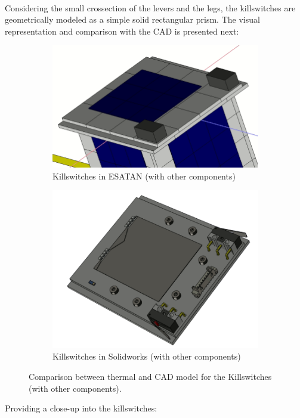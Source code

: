 \paragraph{}

Considering the small crossection of the levers and the legs, the killswitches are geometrically
modeled as a simple solid rectangular prism. The visual representation and comparison with the CAD
is presented next: 

\begin{figure}[H]
    \centering
    \begin{subfigure}{.5\textwidth}
      \centering
      \includegraphics[width=.6\linewidth]{res/img/5_simulationanalisys/Comparisons/ESATAN/Killswitches.PNG}
      \caption{Killswitches in ESATAN (with other components)}
      \label{fig:killswitches}
    \end{subfigure}%
    \begin{subfigure}{.5\textwidth}
      \centering
      \includegraphics[width=.5\linewidth]{res/img/5_simulationanalisys/Comparisons/SLDW/BottomPCB_Solid.PNG}
      \caption{Killswitches in Solidworks (with other components)}
      \label{fig:killswitchessolid}
    \end{subfigure}
    \caption{Comparison between thermal and CAD model for the Killswitches (with other components).}
    \label{fig:killswitchesim}
\end{figure}

Providing a close-up into the killswitches:

